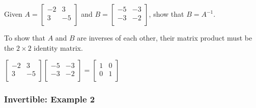 \documentclass[12pt, letterpaper]{article}
\begin{document}
Given $ A =
\begin{bmatrix}
  -2 & 3 \\
  3 & -5 \\
\end{bmatrix} $ and $ B =
\begin{bmatrix}
  -5 & -3 \\
  -3 & -2 \\
\end{bmatrix} $, show that $ B = A^{-1} $.
\bigskip

To show that $ A $ and $ B $ are inverses of each other, their matrix
product must be the $ 2 \times 2 $ identity matrix.
\bigskip

\medskip
{\centering

  $
  \begin{bmatrix}
    -2 & 3 \\
    3 & -5 \\
  \end{bmatrix}
  \begin{bmatrix}
    -5 & -3 \\
    -3 & -2 \\
  \end{bmatrix} =
  \begin{bmatrix}
    1 & 0 \\
    0 & 1 \\
  \end{bmatrix} $

}
\medskip

\subsubsection*{Invertible: Example 2}
\end{document}
